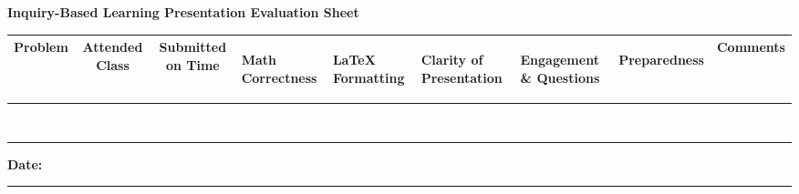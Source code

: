 \documentclass[landscape]{article}
\renewcommand{\arraystretch}{1.8}
\begin{document}
\thispagestyle{empty}

\begin{center}
    \Large\textbf{Inquiry-Based Learning Presentation Evaluation Sheet}
\end{center}

\vspace{0.5cm}

\setlength{\tabcolsep}{4pt}
\renewcommand{\arraystretch}{1.5}

\noindent
\begin{tabular}{|c|c|c|
>{\centering\arraybackslash}m{1.5cm}|
>{\centering\arraybackslash}m{1.5cm}|
>{\centering\arraybackslash}m{1.5cm}|
>{\centering\arraybackslash}m{1.5cm}|
>{\centering\arraybackslash}m{1.5cm}|
>{\arraybackslash}m{5cm}|}
\hline
\textbf{Problem} &
\textbf{Attended Class} &
\textbf{Submitted on Time} &

\begin{turn}{90}\textbf{Math Correctness}\end{turn} &
\begin{turn}{90}\textbf{LaTeX Formatting}\end{turn} &
\begin{turn}{90}\textbf{Clarity of Presentation}\end{turn} &
\begin{turn}{90}\textbf{Engagement \& Questions}\end{turn} &
\begin{turn}{90}\textbf{Preparedness}\end{turn} &

\textbf{Comments} \\
\hline

\hline & & & & & & & & \\ 
\hline & & & & & & & & \\ 
\hline & & & & & & & & \\ 
\hline & & & & & & & & \\ 
\hline & & & & & & & & \\ 
\hline & & & & & & & & \\ 
\hline & & & & & & & & \\ 
\hline & & & & & & & & \\ 
\hline

\end{tabular}

\vspace{1cm}

\noindent \textbf{Date:} \rule{10cm}{0.4pt}
\end{document}
